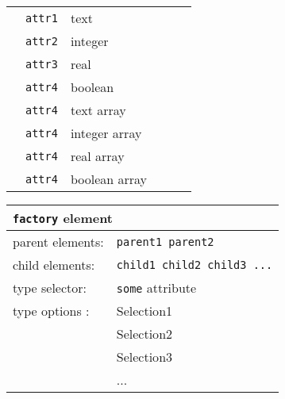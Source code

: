 \begin{table}[h]
\begin{center}
\begin{tabularx}{\textwidth}{l l l l l l }
   &   \texttt{attr1}     &  text              &                  &                     &                       \\
   &   \texttt{attr2}     &  integer           &                  &                     &                       \\
   &   \texttt{attr3}     &  real              &                  &                     &                       \\
   &   \texttt{attr4}     &  boolean           &                  &                     &                       \\
   &   \texttt{attr4}     &  text array        &                  &                     &                       \\
   &   \texttt{attr4}     &  integer array     &                  &                     &                       \\
   &   \texttt{attr4}     &  real array        &                  &                     &                       \\
   &   \texttt{attr4}     &  boolean array     &                  &                     &                       \\
  \hline
\end{tabularx}
\end{center}
\end{table}




\begin{table}[h]
\begin{center}
\begin{tabularx}{\textwidth}{l l l l l l }
\hline
\multicolumn{6}{l}{\texttt{factory} element} \\
\hline
\multicolumn{2}{l}{parent elements:} & \multicolumn{4}{l}{\texttt{parent1 parent2}}\\
\multicolumn{2}{l}{child  elements:} & \multicolumn{4}{l}{\texttt{child1 child2 child3 ...}}\\
\multicolumn{2}{l}{type   selector:} & \multicolumn{4}{l}{\texttt{some} attribute}\\
\multicolumn{2}{l}{type   options :} & \multicolumn{4}{l}{Selection1}\\
\multicolumn{2}{l}{                } & \multicolumn{4}{l}{Selection2}\\
\multicolumn{2}{l}{                } & \multicolumn{4}{l}{Selection3}\\
\multicolumn{2}{l}{                } & \multicolumn{4}{l}{...}\\
  \hline
\end{tabularx}
\end{center}
\end{table}




